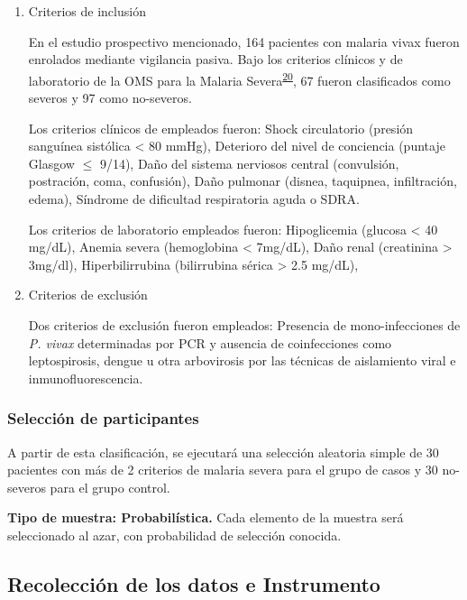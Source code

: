 \documentclass[]{article}
\begin{document}
\begin{enumerate}
\def\labelenumi{\alph{enumi}.}
\item
  Criterios de inclusión

  En el estudio prospectivo mencionado, 164 pacientes con malaria vivax
  fueron enrolados mediante vigilancia pasiva. Bajo los criterios
  clínicos y de laboratorio de la OMS para la Malaria
  Severa\textsuperscript{\protect\hyperlink{ref-WHO2014severe}{20}}, 67
  fueron clasificados como severos y 97 como no-severos.

  Los criterios clínicos de empleados fueron: Shock circulatorio
  (presión sanguínea sistólica \textless{} 80 mmHg), Deterioro del nivel
  de conciencia (puntaje Glasgow \(\le\) 9/14), Daño del sistema
  nerviosos central (convulsión, postración, coma, confusión), Daño
  pulmonar (disnea, taquipnea, infiltración, edema), Síndrome de
  dificultad respiratoria aguda o SDRA.

  Los criterios de laboratorio empleados fueron: Hipoglicemia (glucosa
  \textless{} 40 mg/dL), Anemia severa (hemoglobina \textless{} 7mg/dL),
  Daño renal (creatinina \textgreater{} 3mg/dl), Hiperbilirrubina
  (bilirrubina sérica \textgreater{} 2.5 mg/dL), 
\item
  Criterios de exclusión

  Dos criterios de exclusión fueron empleados: Presencia de
  mono-infecciones de \emph{P. vivax} determinadas por PCR y ausencia de
  coinfecciones como leptospirosis, dengue u otra arbovirosis por las
  técnicas de aislamiento viral e inmunofluorescencia.
\end{enumerate}

\subsubsection{Selección de
participantes}\label{seleccion-de-participantes}

A partir de esta clasificación, se ejecutará una selección aleatoria
simple de 30 pacientes con más de 2 criterios de malaria severa para el
grupo de casos y 30 no-severos para el grupo control.

\textbf{Tipo de muestra: Probabilística.} Cada elemento de la muestra
será seleccionado al azar, con probabilidad de selección conocida.

\subsection{Recolección de los datos e
Instrumento}\label{recoleccion-de-los-datos-e-instrumento}
\end{document}
